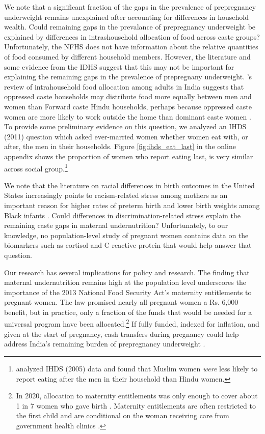 We note that a significant fraction of the gaps in the prevalence of prepregnancy underweight remains unexplained after accounting for differences in household wealth.  Could remaining gaps in the prevalance of prepregnancy underweight be explained by differences in intrashousehold allocation of food across caste groups? Unfortunately, the NFHS does not have information about the relative quantities of food consumed by different household members.  However, the literature and some evidence from the IDHS suggest that this may not be important for explaining the remaining gaps in the prevalence of prepregnany underweight.  \cite{harris2017determinants}'s review  of intrahousehold food allocation among adults in India suggests that oppressed caste households may distribute food more equally between men and women than Forward caste Hindu households, perhaps because oppressed caste women are more likely to work outside the home than dominant caste women \citep{chakrabarty1996gender, eswaran2013status}.  To provide some preliminary evidence on this question, we analyzed an IHDS (2011) question which asked ever-married women whether women eat with, or after, the men in their households.  Figure \ref{fig:ihds_eat_last} in the online appendix shows the proportion of women who report eating last, is very similar across social group.\footnote{\cite{desai2014muslim} analyzed IHDS (2005) data and found that Muslim women \emph{were} less likely to report eating after the men in their household than Hindu women.}  

We note that the literature on racial differences in birth outcomes in the United States increasingly points to racism-related stress among mothers as an important reason for higher rates of preterm birth and lower birth weights among Black infants \citep{hogue2005stress, braveman2015role, sosnaud2021cross}. Could differences in discrimination-related stress explain the remaining caste gaps in maternal undernutrition? Unfortunately, to our knowledge, no population-level study of pregnant women contains data on the biomarkers such as cortisol and C-reactive protein that would help answer that question. 

Our research has several implications for policy and research.  The finding that maternal undernutrition remains high at the population level underscores the importance of the 2013 National Food Security Act's maternity entitlements to pregnant women. The law promised nearly all pregnant women a Rs. 6,000 benefit, but in practice, only a fraction of the funds that would be needed for a universal program have been allocated.\footnote{In 2020, allocation to maternity entitlements was only enough to cover about 1 in 7 women who gave birth \cite{dreze2021derailed}.  Maternity entitlements are often restricted to the first child and are conditional on the woman receiving care from government health clinics \citep{kalra2020birth}.}  If fully funded, indexed for inflation, and given at the start of pregnancy, cash transfers during pregnancy could help address India's remaining burden of prepregnancy underweight \citep{coffey2016underweight}. 

